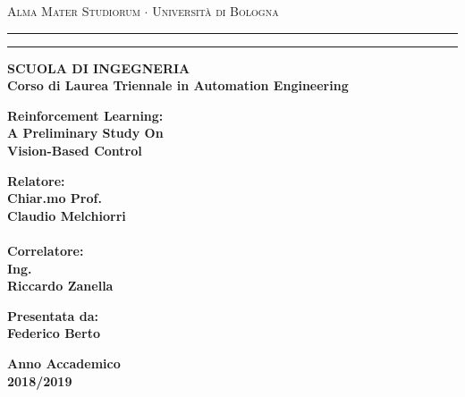 
%


\begin{titlepage}
	\begin{center}
		{{\Large{\textsc{Alma Mater Studiorum $\cdot$ Universit\`a di
						Bologna}}}} \rule[0.1cm]{15.8cm}{0.1mm}
		\rule[0.5cm]{15.8cm}{0.6mm}
		{\small{\bf SCUOLA DI INGEGNERIA\\
				Corso di Laurea Triennale in Automation Engineering}}
	\end{center}
	\vspace{25mm}
	\begin{center}
		{\LARGE{\bf Reinforcement Learning:}}\\
		\vspace{3mm}
		{\LARGE{\bf A Preliminary Study On}}\\
		\vspace{3mm}
		{\LARGE{\bf Vision-Based Control}}\\
		
		
	\end{center}
	\vspace{40mm}
	\par
	\noindent
	\begin{minipage}[t]{0.47\textwidth}
		{\large{\bf Relatore:\\
				Chiar.mo Prof.\\
				Claudio Melchiorri\\}}
		\\
		{\large{\bf Correlatore:\\
		Ing.\\
		Riccardo Zanella}}
	\end{minipage}
	\hfill
	\begin{minipage}[t]{0.47\textwidth}\raggedleft
		{\large{\bf Presentata da:\\
				Federico Berto}}
	\end{minipage}
	\vspace{20mm}
	\begin{center}
		{\large{\bf  Anno Accademico\\
				2018/2019 }}
			
	\end{center}
\end{titlepage}


%